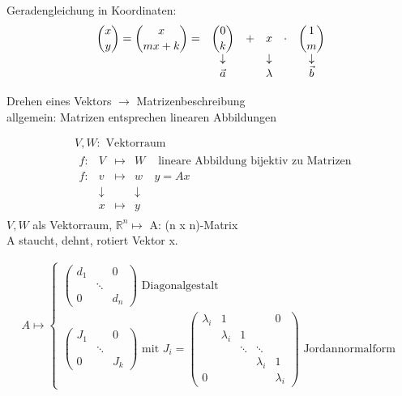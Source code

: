 %
Geradengleichung in Koordinaten:
\begin{equation*}
  \begin{matrix}
    \displaystyle\binom{x}{y} = \binom{x}{mx+k} = & \displaystyle\binom{0}{k} & + & \displaystyle x      & \cdot & \displaystyle\binom{1}{m} \\
                                        &    \downarrow   &   & \downarrow &       & \downarrow \\
                                        &    \vec{a}      &   & \lambda    &       & \vec{b}
  \end{matrix}
\end{equation*}

\noindent Drehen eines Vektors $\longrightarrow$ Matrizenbeschreibung \\
allgemein: Matrizen entsprechen linearen Abbildungen

\begin{align*}
	&V, W: \text{ Vektorraum} \\
	&\begin{matrix}
		f: & V & \mapsto  & W & \text{ lineare Abbildung bijektiv zu Matrizen} \\
		f: & v & \mapsto  & w & y = Ax \\
		   & \downarrow & & \downarrow \\ 
		   & x &\mapsto   & y
	\end{matrix}
\end{align*}
$V, W$ als Vektorraum, $\mathbb{R}^{n} \mapsto$ A: (n x n)-Matrix \\
A staucht, dehnt, rotiert Vektor x.

\begin{align*}
A \mapsto 	\begin{cases} 
			\begin{pmatrix} d_1 & & 0 \\  & \ddots & \\ 0 & & d_n \end{pmatrix} \text{ Diagonalgestalt} \\
			\begin{pmatrix}
			J_1 &          & 0   \\
			    & \ddots &     \\ 
			  0 &          & J_k \end{pmatrix} \text{ mit } J_i= \begin{pmatrix} \lambda_i & 1 &  &  & 0 \\  & \lambda_i & 1 &  &  \\ && \ddots{} & \ddots{}\\ &&& \lambda_i & 1 \\ 0 &  & &  & \lambda_i \end{pmatrix}  \text{ Jordannormalform}
		\end{cases}
\end{align*}

